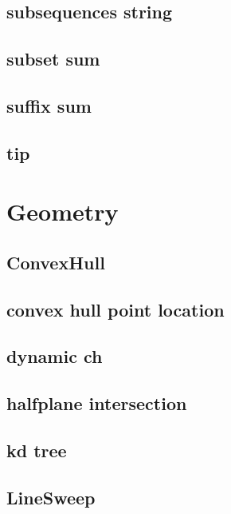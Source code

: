 \subsection{subsequences string}
\raggedbottom
\hrulefill
\subsection{subset sum}
\raggedbottom
\hrulefill
\subsection{suffix sum}
\raggedbottom
\hrulefill
\subsection{tip}
\raggedbottom
\hrulefill

\section{Geometry}
\subsection{ConvexHull}
\raggedbottom
\hrulefill
\subsection{convex hull point location}
\raggedbottom
\hrulefill
\subsection{dynamic ch}
\raggedbottom
\hrulefill
\subsection{halfplane intersection}
\raggedbottom
\hrulefill
\subsection{kd tree}
\raggedbottom
\hrulefill
\subsection{LineSweep}
\raggedbottom
\hrulefill
